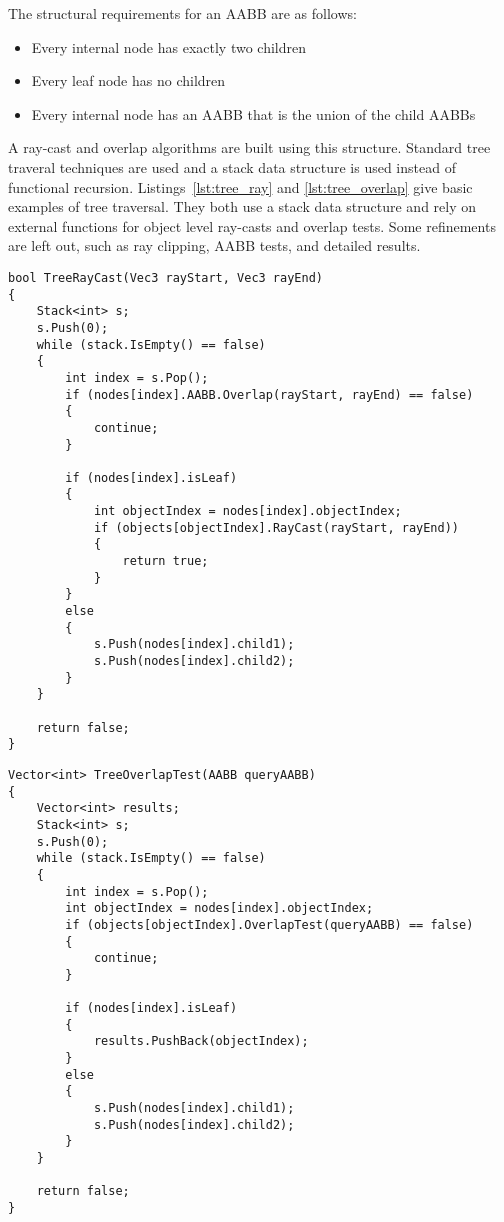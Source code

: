 \documentclass{article}
\begin{document}
The structural requirements for an AABB are as follows:
\begin{itemize}
	\item Every internal node has exactly two children
	\item Every leaf node has no children
	\item Every internal node has an AABB that is the union of the child AABBs
\end{itemize}

A ray-cast and overlap algorithms are built using this structure. Standard tree traveral techniques are used and a stack data structure is used instead of functional recursion. Listings~\ref{lst:tree_ray} and \ref{lst:tree_overlap} give basic examples of tree traversal. They both use a stack data structure and rely on external functions for object level ray-casts and overlap tests. Some refinements are left out, such as ray clipping, AABB tests, and detailed results.

\begin{lstlisting}[caption={Tree ray-cast}, label={lst:tree_ray}, float]
bool TreeRayCast(Vec3 rayStart, Vec3 rayEnd)
{
	Stack<int> s;
	s.Push(0);
	while (stack.IsEmpty() == false)
	{
		int index = s.Pop();
		if (nodes[index].AABB.Overlap(rayStart, rayEnd) == false)
		{
			continue;
		}

		if (nodes[index].isLeaf)
		{
			int objectIndex = nodes[index].objectIndex;
			if (objects[objectIndex].RayCast(rayStart, rayEnd))
			{
				return true;
			}
		}
		else
		{
			s.Push(nodes[index].child1);
			s.Push(nodes[index].child2);
		}
	}

	return false;
}
\end{lstlisting}

\begin{lstlisting}[caption={Tree overlap test}, label={lst:tree_overlap}, float]
Vector<int> TreeOverlapTest(AABB queryAABB)
{
	Vector<int> results;
	Stack<int> s;
	s.Push(0);
	while (stack.IsEmpty() == false)
	{
		int index = s.Pop();
		int objectIndex = nodes[index].objectIndex;
		if (objects[objectIndex].OverlapTest(queryAABB) == false)
		{
			continue;
		}

		if (nodes[index].isLeaf)
		{
			results.PushBack(objectIndex);
		}
		else
		{
			s.Push(nodes[index].child1);
			s.Push(nodes[index].child2);
		}
	}

	return false;
}
\end{lstlisting}
\end{document}
